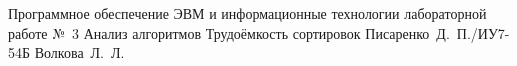 \documentclass{bmstu}[a4paper]
\begin{document}
    {Программное обеспечение ЭВМ и информационные технологии}
    {лабораторной работе №~3}
    {Анализ алгоритмов}
    {Трудоёмкость сортировок}
    {}
    {Писаренко~Д.~П./ИУ7-54Б}
    {Волкова~Л.~Л.}

    \maketableofcontents

    
    
    
    
    
    

    \makebibliography
\end{document}
